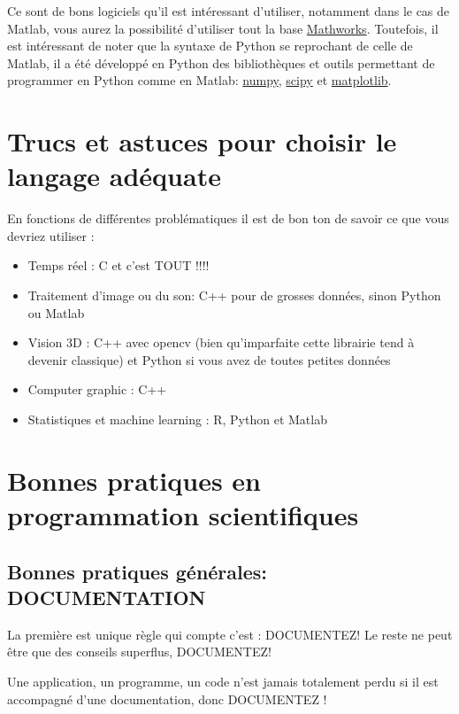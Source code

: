Ce sont de bons logiciels qu'il est intéressant d'utiliser, notamment dans le cas de Matlab, 
vous aurez la possibilité d'utiliser tout la base \href{http://www.mathworks.fr/matlabcentral/fileexchange}{Mathworks}.
Toutefois, il est intéressant de noter que la syntaxe de Python se reprochant de celle de Matlab, il a 
été développé en Python des bibliothèques et outils permettant de programmer en Python comme en Matlab: 
\href{http://www.numpy.org/}{numpy}, \href{http://www.scipy.org/}{scipy} et \href{http://matplotlib.org/}{matplotlib}.\\



\section{Trucs et astuces pour choisir le langage adéquate}

En fonctions de différentes problématiques il est de bon ton de savoir ce que vous devriez utiliser :

\begin{itemize}
\item Temps réel : C et c'est TOUT !!!!
\item Traitement d'image ou du son: C++ pour de grosses données, sinon Python ou Matlab
\item Vision 3D : C++ avec opencv (bien qu'imparfaite cette librairie tend à devenir classique) 
et Python si vous avez de toutes petites données
\item Computer graphic : C++ 
\item Statistiques et machine learning : R, Python et Matlab
\end{itemize}  

\section{Bonnes pratiques en programmation scientifiques}

\subsection{Bonnes pratiques générales: DOCUMENTATION}

La première est unique règle qui compte c'est : DOCUMENTEZ!
Le reste ne peut être que des conseils superflus, DOCUMENTEZ! 

Une application, un programme, un code n'est jamais totalement perdu si 
il est accompagné d'une documentation, donc DOCUMENTEZ !\\

